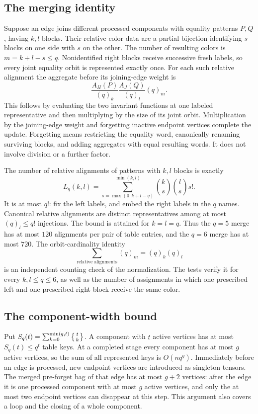 \subsection{The merging identity}
Suppose an edge joins different processed components with equality
patterns $P,Q$, having $k,l$ blocks.  Their relative color data are a
partial bijection identifying $s$ blocks on one side with $s$ on the other.
The number of resulting colors is $m=k+l-s\le q$.  Nonidentified right
blocks receive successive fresh labels, so every joint equality orbit is
represented exactly once.  For each such relative alignment the aggregate
before its joining-edge weight is
\[
 \frac{A_H(P)}{(q)_k}\frac{A_J(Q)}{(q)_l}(q)_m.
\]
This follows by evaluating the two invariant functions at one labeled
representative and then multiplying by the size of its joint orbit.
Multiplication by the joining-edge weight and forgetting inactive endpoint
vertices complete the update.  Forgetting means restricting the equality
word, canonically renaming surviving blocks, and adding aggregates with
equal resulting words.  It does not involve division or a further factor.

The number of relative alignments of patterns with $k,l$ blocks is exactly
\[
 L_q(k,l)=\sum_{s=\max(0,k+l-q)}^{\min(k,l)}
           \binom{k}{s}\binom{l}{s}s!.
\]
It is at most $q!$: fix the left labels, and embed the right labels in
the $q$ names.  Canonical relative alignments are distinct representatives
among at most $(q)_l\le q!$ injections.  The bound is attained for
$k=l=q$.  Thus the $q=5$ merge has at most $120$ alignments per pair of
table entries, and the $q=6$ merge has at most $720$.
The orbit-cardinality identity
\[
 \sum_{\text{relative alignments}}(q)_m=(q)_k(q)_l
\]
is an independent counting check of the normalization.  The tests verify
it for every $k,l\le q\le6$, as well as the number of assignments in which
one prescribed left and one prescribed right block receive the same color.

\subsection{The component-width bound}
Put $S_q(t)=\sum_{k=0}^{\min(q,t)}\left\{{t\atop k}\right\}$.
A component with $t$ active vertices has at most $S_q(t)\le q^t$ table keys.
At a completed stage every component has at most $g$ active vertices, so
the sum of all represented keys is $O(nq^g)$.  Immediately before an edge
is processed, new endpoint vertices are introduced as singleton tensors.
The merged pre-forget bag of that edge has at most $g+2$ vertices: after
the edge it is one processed component with at most $g$ active vertices,
and only the at most two endpoint vertices can disappear at this step.
This argument also covers a loop and the closing of a whole component.


